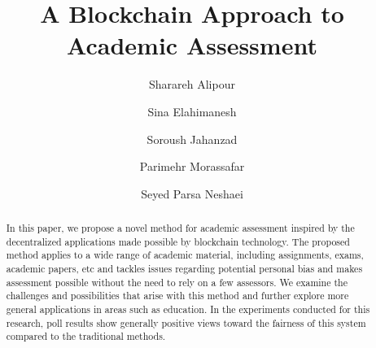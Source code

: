 \documentclass[manuscript,review,anonymous]{acmart}%
\begin{document}
\title{A Blockchain Approach to Academic Assessment}


\author{Sharareh Alipour}
\authornotemark[1]

\author{Sina Elahimanesh}

\author{Soroush Jahanzad}

\author{Parimehr Morassafar}

\author{Seyed Parsa Neshaei}



\renewcommand{\shortauthors}{Alipour et al.}

\begin{abstract}
  In this paper, we propose a novel method for academic assessment inspired by the decentralized applications made possible by blockchain technology.
  The proposed method applies to a wide range of academic material, including assignments, exams, academic papers, etc 
  and tackles issues regarding potential personal bias and makes assessment possible without the need to rely on a few assessors.
  We examine the challenges and possibilities that arise with this method and further explore more general applications in areas such as education.
  In the experiments conducted for this research, poll results show generally positive views toward the fairness of this system compared to the traditional methods.
  
\end{abstract}
\end{document}
